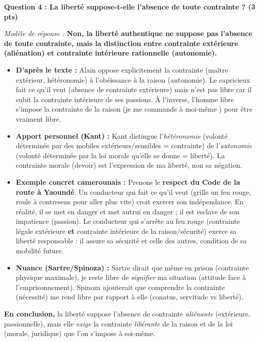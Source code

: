 \documentclass[11pt]{article}
\newcommand{\cle}[1]{{\popxbold\color{popdark}#1}}
\begin{document}
\begin{exoresolu}
\vspace{0.5cm}
\textbf{Question 4 : \og La liberté suppose-t-elle l'absence de toute contrainte ? \fg (3 pts)}

\emph{Modèle de réponse :}
\og \textbf{Non, la liberté authentique ne suppose pas l'absence de toute contrainte, mais la distinction entre contrainte extérieure (aliénation) et contrainte intérieure rationnelle (\cle{autonomie}).}
\begin{itemize}
    \item \textbf{D'après le texte :} Alain oppose explicitement la \og contrainte \fg (maître extérieur, hétéronomie) à l'\og obéissance à la raison \fg (autonomie). Le capricieux \og fait ce qu'il veut \fg (absence de contrainte extérieure) mais n'est \og pas libre \fg car il subit la contrainte intérieure de ses passions. À l'inverse, l'homme libre s'impose la contrainte de la raison (\og je me commande à moi-même \fg) pour être vraiment libre.
    \item \textbf{Apport personnel (Kant) :} Kant distingue l'\emph{hétéronomie} (volonté déterminée par des mobiles extérieurs/sensibles = contrainte) de l'\emph{autonomie} (volonté déterminée par la loi morale qu'elle se donne = liberté). La contrainte morale (devoir) est l'expression de ma liberté, non sa négation.
    \item \textbf{Exemple concret camerounais :} Prenons le \textbf{respect du Code de la route à Yaoundé}. Un conducteur qui \og fait ce qu'il veut \fg (grille un feu rouge, roule à contresens pour aller plus vite) croit exercer son indépendance. En réalité, il se met en danger et met autrui en danger ; il est esclave de son impatience (passion). Le conducteur qui s'arrête au feu rouge (contrainte légale extérieure \textbf{et} contrainte intérieure de la raison/sécurité) exerce sa liberté responsable : il assure sa sécurité et celle des autres, condition de sa mobilité future.
    \item \textbf{Nuance (Sartre/Spinoza) :} Sartre dirait que même en prison (contrainte physique maximale), je reste libre de \emph{signifier} ma situation (attitude face à l'emprisonnement). Spinoza ajouterait que comprendre la contrainte (nécessité) me rend libre par rapport à elle (\cle{conatus}, \cle{servitude} vs liberté).
\end{itemize}
\textbf{En conclusion,} la liberté suppose l'absence de contrainte \emph{aliénante} (extérieure, passionnelle), mais elle \emph{exige} la contrainte \emph{libérante} de la raison et de la loi (morale, juridique) que l'on s'impose à soi-même. \fg


\end{exoresolu}
\end{document}
